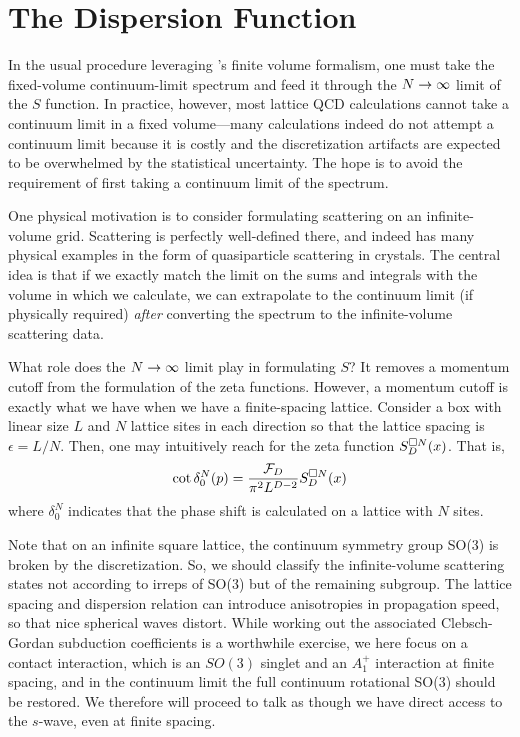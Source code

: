 \section{The Dispersion Function}\label{sec:dispersion}

In the usual procedure leveraging \Luscher's finite volume formalism, one must take the fixed-volume continuum-limit spectrum and feed it through the $N\rightarrow\infty$ limit of the $S$ function.
In practice, however, most lattice QCD calculations cannot take a continuum limit in a fixed volume---many calculations indeed do not attempt a continuum limit because it is costly and the discretization artifacts are expected to be overwhelmed by the statistical uncertainty.
The hope is to avoid the requirement of first taking a continuum limit of the spectrum.

One physical motivation is to consider formulating scattering on an infinite-volume grid.
Scattering is perfectly well-defined there, and indeed has many physical examples in the form of quasiparticle scattering in crystals.
The central idea is that if we exactly match the limit on the sums and integrals with the volume in which we calculate, we can extrapolate to the continuum limit (if physically required) \emph{after} converting the spectrum to the infinite-volume scattering data.

What role does the $N\rightarrow\infty$ limit play in formulating $S$?
It removes a momentum cutoff from the formulation of the zeta functions.
However, a momentum cutoff is exactly what we have when we have a finite-spacing lattice.
Consider a box with linear size $L$ and $N$ lattice sites in each direction so that the lattice spacing is $\epsilon=L/N$.
Then, one may intuitively reach for the zeta function $S_D^{\square N}(x)$.  That is,
\begin{equation}\label{eq:cutoff cartesian S}
    \cot \delta_0^N(p) = \frac{\mathcal{F}_D}{\pi^2 L^{D-2}} S_D^{\square N}(x)
\end{equation}
where $\delta_0^N$ indicates that the phase shift is calculated on a lattice with $N$ sites.

Note that on an infinite square lattice, the continuum symmetry group SO(3) is broken by the discretization.
So, we should classify the infinite-volume scattering states not according to irreps of SO(3) but of the remaining subgroup.
The lattice spacing and dispersion relation can introduce anisotropies in propagation speed, so that nice spherical waves distort.
While working out the associated Clebsch-Gordan subduction coefficients is a worthwhile exercise, we here focus on a contact interaction, which is an $SO(3)$ singlet and an $A_1^+$ interaction at finite spacing, and in the continuum limit the full continuum rotational SO(3) should be restored.
We therefore will proceed to talk as though we have direct access to the $s$-wave, even at finite spacing.

